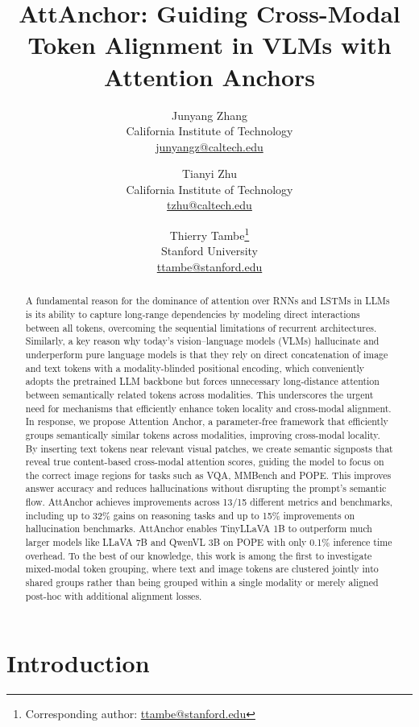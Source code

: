 \documentclass[11pt]{article}
\title{AttAnchor: Guiding Cross-Modal Token Alignment in VLMs with Attention Anchors}
\author{Junyang Zhang\\
California Institute of Technology\\
\href{mailto:junyangz@caltech.edu}{junyangz@caltech.edu}
\and
Tianyi Zhu\\
California Institute of Technology\\
\href{mailto:tzhu@caltech.edu}{tzhu@caltech.edu}
\and
Thierry Tambe\footnote{Corresponding author: \href{mailto:ttambe@stanford.edu}{ttambe@stanford.edu}}\\
Stanford University\\
\href{mailto:ttambe@stanford.edu}{ttambe@stanford.edu}
}
\begin{document}
\captionsetup{position=bottom}
\captionsetup[figure]{position=bottom}
\captionsetup[table]{position=bottom}

\maketitle

\begin{abstract}
A fundamental reason for the dominance of attention over RNNs and LSTMs in LLMs is its ability to capture long-range dependencies by modeling direct interactions between all tokens, overcoming the sequential limitations of recurrent architectures. Similarly, a key reason why today's vision–language models (VLMs) hallucinate and underperform pure language models is that they rely on direct concatenation of image and text tokens with a modality-blinded positional encoding, which conveniently adopts the pretrained LLM backbone but forces unnecessary long-distance attention between semantically related tokens across modalities. This underscores the urgent need for mechanisms that efficiently enhance token locality and cross-modal alignment. In response, we propose Attention Anchor, a parameter-free framework that efficiently groups semantically similar tokens across modalities, improving cross-modal locality. By inserting text tokens near relevant visual patches, we create semantic signposts that reveal true content-based cross-modal attention scores, guiding the model to focus on the correct image regions for tasks such as VQA, MMBench and POPE. This improves answer accuracy and reduces hallucinations without disrupting the prompt's semantic flow. AttAnchor achieves improvements across 13/15 different metrics and benchmarks, including up to 32\% gains on reasoning tasks and up to 15\% improvements on hallucination benchmarks. AttAnchor enables TinyLLaVA 1B to outperform much larger models like LLaVA 7B and QwenVL 3B on POPE with only 0.1\% inference time overhead. To the best of our knowledge, this work is among the first to investigate mixed-modal token grouping, where text and image tokens are clustered jointly into shared groups rather than being grouped within a single modality or merely aligned post-hoc with additional alignment losses.
\end{abstract}

\section{Introduction}
\end{document}
